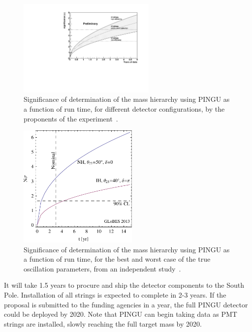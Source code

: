 \begin{figure}[bp]
\begin{center}
\includegraphics[width=0.6\textwidth]{KBL/pingu_nmh_sensitivity.pdf}
\caption{Significance of determination of the mass hierarchy using
PINGU as a function of run time, for different detector configurations, by the proponents of the experiment~\cite{atm:pingu}.  }
\label{PINGU:senown}
\end{center}
\end{figure}
\begin{figure}[tbp]
\begin{center}
\includegraphics[width=0.52\textwidth]{KBL/atm_expplot.pdf}
\caption{Significance of determination of the mass hierarchy using
PINGU as a function of run time, for the best and worst case of the
true oscillation parameters, from an independent study~\cite{atm:Winter}.}
\label{PINGU:sen}
\end{center}
\end{figure}


It will take 1.5 years to procure and ship the detector components to
the South Pole.  Installation of all strings is expected to complete in
2-3 years.  If the proposal is submitted to the funding agencies in a
year, the full PINGU detector could be deployed by 2020.  Note that PINGU
can begin taking data as PMT strings are installed, slowly reaching
the full target mass by 2020.

